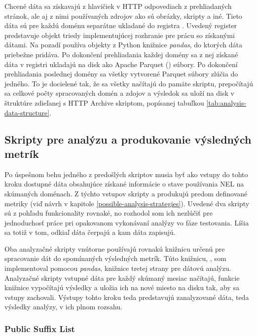 Chcené dáta sa získavajú z hlavičiek v HTTP odpovediach z prehliadaných stránok, ale aj z nimi používaných zdrojov ako sú obrázky, skripty a iné.
Tieto dáta sú pre každú doménu separátne ukladané do registra .
Uvedený register predstavuje objekt triedy implementujúcej rozhranie pre prácu so získanými dátami. 
Na pozadí používa  objekty z Python knižnice \textit{pandas}, do ktorých dáta priebežne pridáva.
Po dokončení prehliadania každej domény sa z nej získané dáta v registri ukladajú na disk ako Apache Parquet () súbory.
Po dokončení prehliadania poslednej domény sa všetky vytvorené Parquet súbory zlúčia do jedného.
To je docielené tak, že sa všetky načítajú do pamäte skriptu, prepočítajú sa celkové počty spracovaných domén a zdojov a výsledok sa uloží na disk v štruktúre zdieľanej s HTTP Archive skriptom, popísanej tabuľkou \ref{tab:analysis-data-structure}.

\subsection{Skripty pre analýzu a produkovanie výsledných metrík}

Po úspešnom behu jedného z predošlých skriptov musia byť ako vstupy do tohto kroku dostupné dáta obsahujúce získané informácie o stave používania NEL na skúmaných doménach.
Z týchto vstupov skripty  a  produkujú predom definované metriky (viď návrh v kapitole \ref{possible-analysis-strategies}).
Uvedené dva skripty sú z pohľadu funkcionality rovnaké, no rozhodol som ich nezlúčiť pre jednoduchosť práce pri opakovanom vykonávaní analýzy vo fáze testovania.
Líšia sa totiž v tom, odkiaľ dáta čerpajú a kam dáta zapisujú.

Oba analyzačné skripty vnútorne používajú rovnakú knižnicu určenú pre spracovanie dát do spomínaných výsledných metrík.
Túto knižnicu, , som implementoval pomocou \textit{pandas}, knižnice tretej strany pre dátovú analýzu.
Analyzačné skripty vstupné dáta pre každý skúmaný mesiac načítajú, funkcie knižnice vypočítajú výsledky a uložia ich na nové miesto na disku tak, aby sa vstupy zachovali.
Výstupy tohto kroku teda predstavujú zanalyzované dáta, teda výsledky analýzy, v ich plnom rozsahu.

\subsubsection{Public Suffix List}

